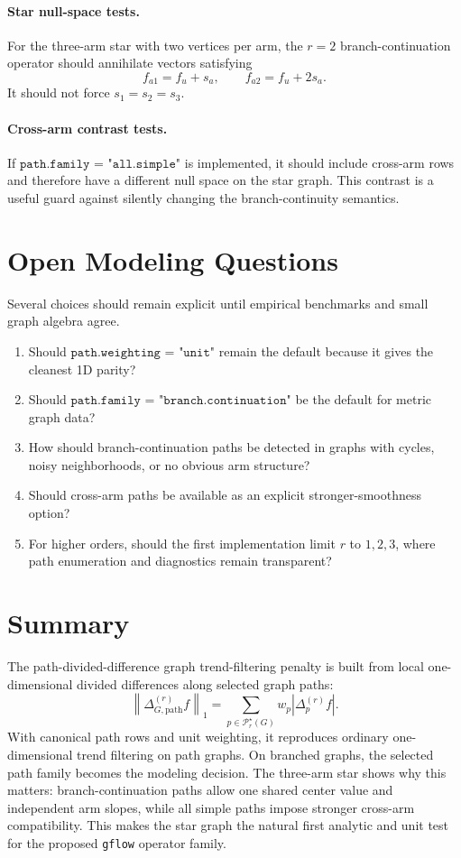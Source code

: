 \documentclass[11pt]{article}
\newcommand{\norm}[1]{\left\lVert #1 \right\rVert}
\newcommand{\Path}{\mathcal P}
\begin{document}
\paragraph{Star null-space tests.}
For the three-arm star with two vertices per arm, the \(r=2\)
branch-continuation operator should annihilate vectors satisfying
\[
  f_{a1}=f_u+s_a,\qquad f_{a2}=f_u+2s_a.
\]
It should not force \(s_1=s_2=s_3\).

\paragraph{Cross-arm contrast tests.}
If \(\texttt{path.family = "all.simple"}\) is implemented, it should include
cross-arm rows and therefore have a different null space on the star graph.
This contrast is a useful guard against silently changing the branch-continuity
semantics.

\section{Open Modeling Questions}

Several choices should remain explicit until empirical benchmarks and small
graph algebra agree.

\begin{enumerate}
  \item Should \(\texttt{path.weighting = "unit"}\) remain the default because
        it gives the cleanest 1D parity?
  \item Should \(\texttt{path.family = "branch.continuation"}\) be the default
        for metric graph data?
  \item How should branch-continuation paths be detected in graphs with cycles,
        noisy neighborhoods, or no obvious arm structure?
  \item Should cross-arm paths be available as an explicit stronger-smoothness
        option?
  \item For higher orders, should the first implementation limit \(r\) to
        \(1,2,3\), where path enumeration and diagnostics remain transparent?
\end{enumerate}

\section{Summary}

The path-divided-difference graph trend-filtering penalty is built from local
one-dimensional divided differences along selected graph paths:
\[
  \norm{\Delta^{(r)}_{G,\mathrm{path}}f}_1
  =
  \sum_{p\in\Path_r^\star(G)}
  w_p|\Delta^{(r)}_p f|.
\]
With canonical path rows and unit weighting, it reproduces ordinary
one-dimensional trend filtering on path graphs.  On branched graphs, the
selected path family becomes the modeling decision.  The three-arm star shows
why this matters: branch-continuation paths allow one shared center value and
independent arm slopes, while all simple paths impose stronger cross-arm
compatibility.  This makes the star graph the natural first analytic and unit
test for the proposed \texttt{gflow} operator family.
\end{document}
